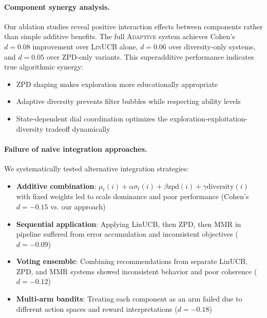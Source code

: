 \paragraph{Component synergy analysis.} Our ablation studies reveal positive interaction effects between components rather than simple additive benefits. The full \textsc{Adaptive} system achieves Cohen's $d = 0.08$ improvement over \textsc{LinUCB} alone, $d = 0.06$ over diversity-only systems, and $d = 0.05$ over ZPD-only variants. This superadditive performance indicates true algorithmic synergy:
\begin{itemize}
  \item ZPD shaping makes exploration more educationally appropriate
  \item Adaptive diversity prevents filter bubbles while respecting ability levels
  \item State-dependent dial coordination optimizes the exploration-exploitation-diversity tradeoff dynamically
\end{itemize}

\paragraph{Failure of naive integration approaches.} We systematically tested alternative integration strategies:
\begin{itemize}
  \item \textbf{Additive combination}: $\mu_t(i) + \alpha \sigma_t(i) + \beta \text{zpd}(i) + \gamma \text{diversity}(i)$ with fixed weights led to scale dominance and poor performance (Cohen's $d = -0.15$ vs. our approach)
  \item \textbf{Sequential application}: Applying LinUCB, then ZPD, then MMR in pipeline suffered from error accumulation and inconsistent objectives ($d = -0.09$)  
  \item \textbf{Voting ensemble}: Combining recommendations from separate LinUCB, ZPD, and MMR systems showed inconsistent behavior and poor coherence ($d = -0.12$)
  \item \textbf{Multi-arm bandits}: Treating each component as an arm failed due to different action spaces and reward interpretations ($d = -0.18$)
\end{itemize}

